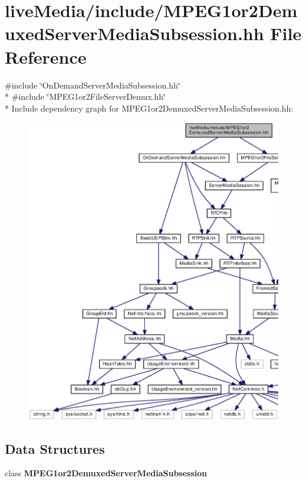 \section{live\+Media/include/\+M\+P\+E\+G1or2\+Demuxed\+Server\+Media\+Subsession.hh File Reference}
\label{MPEG1or2DemuxedServerMediaSubsession_8hh}
{\ttfamily \#include \char`\"{}On\+Demand\+Server\+Media\+Subsession.\+hh\char`\"{}}\\*
{\ttfamily \#include \char`\"{}M\+P\+E\+G1or2\+File\+Server\+Demux.\+hh\char`\"{}}\\*
Include dependency graph for M\+P\+E\+G1or2\+Demuxed\+Server\+Media\+Subsession.\+hh\+:
\nopagebreak
\begin{figure}[H]
\begin{center}
\leavevmode
\includegraphics[width=350pt]{MPEG1or2DemuxedServerMediaSubsession_8hh__incl}
\end{center}
\end{figure}
\subsection*{Data Structures}
\begin{DoxyCompactItemize}
\item 
class {\bf M\+P\+E\+G1or2\+Demuxed\+Server\+Media\+Subsession}
\end{DoxyCompactItemize}
